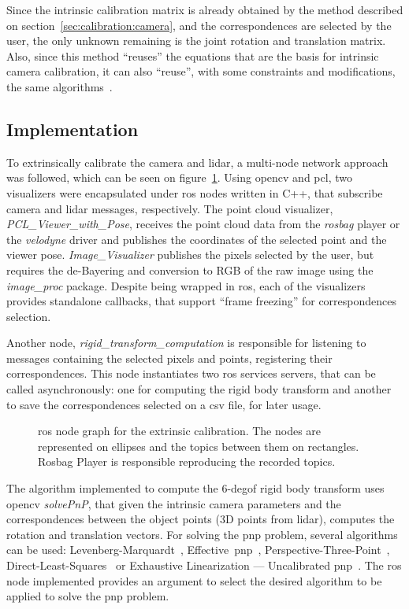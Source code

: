 Since the intrinsic calibration matrix is already obtained by the method described on section~\ref{sec:calibration:camera}, and the correspondences are selected by the user, the only unknown remaining is the joint rotation and translation matrix. Also, since this method ``reuses'' the equations that are the basis for intrinsic camera calibration, it can also ``reuse'', with some constraints and modifications, the same algorithms~\cite{opencv_doc}.


\subsection{Implementation}
To extrinsically calibrate the camera and \ac{lidar}, a multi-node network approach was followed, which can be seen on figure~\ref{fig:extrinsic-calibration-rosgraph}. Using \ac{opencv} and \ac{pcl}, two visualizers were encapsulated under \ac{ros} nodes written in C++, that subscribe camera and \ac{lidar} messages, respectively. The point cloud visualizer, \emph{PCL\_Viewer\_with\_Pose}, receives the point cloud data from the \emph{rosbag} player or the \emph{velodyne} driver and publishes the coordinates of the selected point and the viewer pose. \emph{Image\_Visualizer} publishes the pixels selected by the user, but requires the de-Bayering and conversion to RGB of the raw image using the \emph{image\_proc} package. Despite being wrapped in \ac{ros}, each of the visualizers provides standalone callbacks, that support ``frame freezing'' for correspondences selection.

Another node, \emph{rigid\_transform\_computation} is responsible for listening to messages containing the selected pixels and points, registering their correspondences. This node  instantiates two \ac{ros} services servers, that can be called asynchronously: one for computing the rigid body transform and another to save the correspondences selected on a \ac{csv} file, for later usage. 

\begin{figure}[ht]
	\centering
	\def\svgwidth{\columnwidth}
	\graphicspath{{img/calibration/}}
	
	\caption{\ac{ros} node graph for the extrinsic calibration. The nodes are represented on  ellipses and the topics between them on rectangles. Rosbag Player is responsible reproducing the recorded topics.}
	\label{fig:extrinsic-calibration-rosgraph}
\end{figure}


The algorithm implemented to compute the 6-\ac{degof} rigid body transform uses \ac{opencv} \emph{solvePnP}, that given the intrinsic camera parameters and the correspondences between the object points (3D points from \ac{lidar}), computes the rotation and translation vectors. For solving the \ac{pnp} problem, several algorithms can be used: Levenberg-Marquardt~\cite{Levenberg1943}, Effective~\ac{pnp}~\cite{Lepetit2009}, Perspective-Three-Point~\cite{Gao2003}, Direct-Least-Squares~\cite{Hesch2011} or Exhaustive Linearization — Uncalibrated \ac{pnp}~\cite{Penate-Sanchez2013a}. The \ac{ros} node implemented provides an argument to select the desired algorithm to be applied to solve the \ac{pnp} problem.

